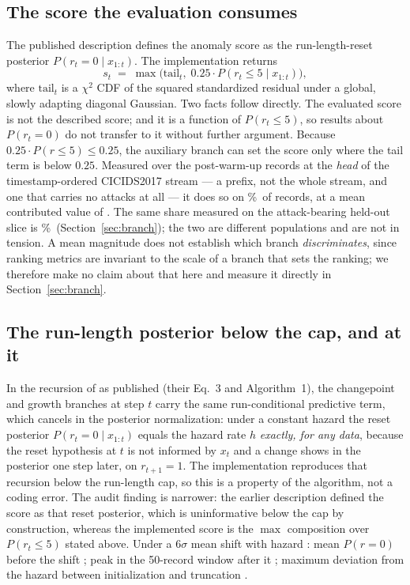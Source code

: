 \documentclass[manuscript,anonymous,review]{acmart}
\begin{document}
\subsection{The score the evaluation consumes}
The published description defines the anomaly score as the run-length-reset
posterior $P(r_t{=}0\mid x_{1:t})$. The implementation returns
\[
s_t \;=\; \max\bigl(\text{tail}_t,\; 0.25 \cdot P(r_t \le 5 \mid x_{1:t})\bigr),
\]
where $\text{tail}_t$ is a $\chi^2$ CDF of the squared standardized residual
under a global, slowly adapting diagonal Gaussian. Two facts follow directly.
The evaluated score is not the described score; and it is a function of
$P(r_t\le5)$, so results about $P(r_t{=}0)$ do not transfer to it without
further argument. Because $0.25\cdot P(r\le5)\le0.25$, the auxiliary branch can
set the score only where the tail term is below $0.25$. Measured over the
\SThreeBindingRows{} post-warm-up records at the \emph{head} of the
timestamp-ordered CICIDS2017 stream --- a prefix, not the whole stream, and one
that carries no attacks at all --- it does so on
\SThreeChangePointBindingPct\%\ of records, at a mean contributed value of
\SThreeChangePointBindingMeanValue. The same share measured on the
attack-bearing held-out slice is \RevBranchAuxBindsHeldoutPct\%\
(Section~\ref{sec:branch}); the two are different populations and are not in
tension. A mean magnitude does
not establish which branch \emph{discriminates}, since ranking metrics are
invariant to the scale of a branch that sets the ranking; we therefore make no
claim about that here and measure it directly in
Section~\ref{sec:branch}.

\subsection{The run-length posterior below the cap, and at it}
In the recursion of \citet{adams2007bocpd} as published
(their Eq.~3 and Algorithm~1), the changepoint and growth branches at step $t$
carry the same run-conditional predictive term, which cancels in the posterior normalization: under a
constant hazard the reset posterior $P(r_t{=}0\mid x_{1:t})$ equals the hazard
rate $h$ \emph{exactly, for any data}, because the reset hypothesis at $t$ is
not informed by $x_t$ and a change shows in the posterior one step later, on
$r_{t+1}{=}1$. The implementation reproduces that recursion below the
run-length cap, so this is a property of the algorithm, not a coding error.
The audit finding is narrower: the earlier description defined the score as
that reset posterior, which is uninformative below the cap by construction,
whereas the implemented score is the $\max$ composition over $P(r_t\le5)$
stated above. Under a $6\sigma$ mean shift with
hazard \SThreeProbeHazard: mean $P(r{=}0)$ before the shift
\SThreePrZeroPreMean; peak in the 50-record window after it
\SThreePrZeroResponsePeak; maximum deviation from the hazard between
initialization and truncation \SThreePrZeroSteadyMaxDeviation.
\end{document}
